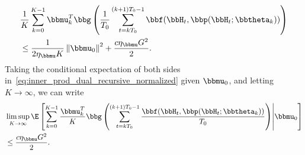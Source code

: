 \begin{align}\label{eq:inner_prod_dual_recursive_normalized}
&\frac{1}{K} \sum_{k=0}^{K-1} \bbmu_k^T \bbg\left( \frac{1}{T_0} \sum_{t=kT_0}^{(k+1)T_0-1} \bbf(\bbH_{t}, \bbp(\bbH_{t};\bbtheta_k)) \right)\nonumber \\
&\leq \frac{1}{2\eta_{\bbmu}K} \left\|\bbmu_0\right\|^2 + \frac{c\eta_{\bbmu}G^2}{2}.
\end{align}
Taking the conditional expectation of both sides in~\eqref{eq:inner_prod_dual_recursive_normalized} given $\bbmu_0$, and letting $K\to\infty$, we can write
\begin{align}
&\limsup_{K\to\infty} \E\left[\sum_{k=0}^{K-1} \frac{\bbmu_k^T}{K} \bbg\left(  \sum_{t=kT_0}^{(k+1)T_0-1} \frac{\bbf(\bbH_{t}, \bbp(\bbH_{t};\bbtheta_k))}{T_0} \right)\middle|\bbmu_0\right] \nonumber \\
&\leq \frac{c\eta_{\bbmu}G^2}{2}.\label{eq:inner_prod_dual_limsup}
\end{align}


